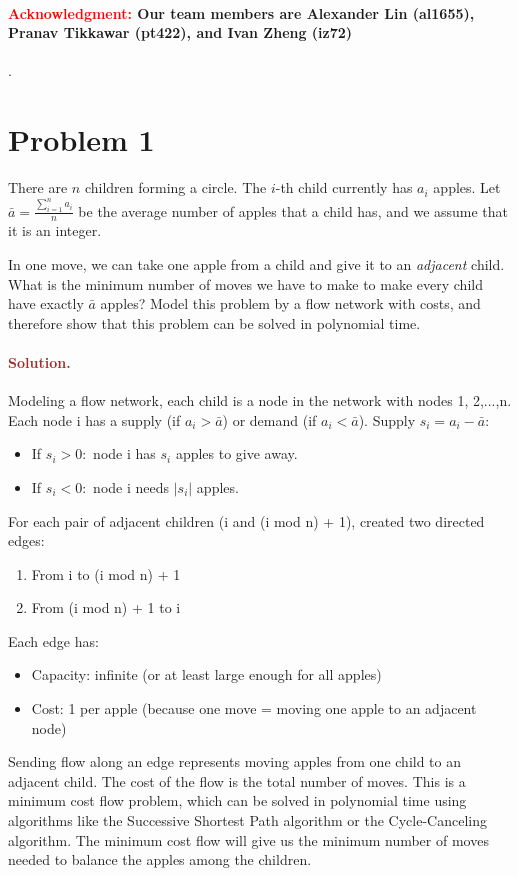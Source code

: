 \paragraph{\textcolor{red}{Acknowledgment:} Our team members are \textbf{Alexander Lin (al1655)}, \textbf{Pranav Tikkawar (pt422)}, and \textbf{Ivan Zheng (iz72)}}.


\section*{Problem 1}
There are $n$ children forming a circle. The $i$-th child currently has $a_i$ apples. Let $\bar a = \frac{\sum_{i = 1}^n a_i}{n}$ be the average number of apples that a child has, and we assume that it is an integer.

In one move, we can take one apple from a child and give it to an \emph{adjacent} child. What is the minimum number of moves we have to make to make every child have exactly $\bar a$ apples? Model this problem by a flow network with costs, and therefore show that this problem can be solved in polynomial time.

\paragraph{\textcolor{brown}{Solution.}}
Modeling a flow network, each child is a node in the network with nodes 1, 2,...,n. Each node i has a supply (if $a_i > \bar{a}$) or demand (if $a_i < \bar{a}$). Supply $s_i = a_i - \bar{a}$: 
\begin{itemize} \item If $s_i > 0:$ node i has $s_i$ apples to give away. \item If $s_i < 0:$ node i needs $|s_i|$ apples. \end{itemize} 
For each pair of adjacent children (i and (i mod n) + 1), created two directed edges:
\begin{enumerate} \item From i to (i mod n) + 1 \item From (i mod n) + 1 to i \end{enumerate}
Each edge has:
\begin{itemize} \item Capacity: infinite (or at least large enough for all apples) \item Cost: 1 per apple (because one move = moving one apple to an adjacent node) \end{itemize} 
Sending flow along an edge represents moving apples from one child to an adjacent child. The cost of the flow is the total number of moves. This is a minimum cost flow problem, which can be solved in polynomial time using algorithms like the Successive Shortest Path algorithm or the Cycle-Canceling algorithm. The minimum cost flow will give us the minimum number of moves needed to balance the apples among the children.


